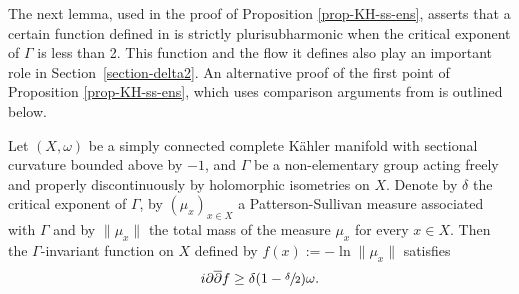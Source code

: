 The next lemma, used in the proof of Proposition \ref{prop-KH-ss-ens}, asserts that a certain function defined in \cite{connellNaturalFlowCritical2023} is strictly plurisubharmonic when the critical exponent of $\Gamma$ is less than 2. This function and the flow it defines also play an important role in Section~\ref{section-delta2}. An alternative proof of the first point of Proposition \ref{prop-KH-ss-ens}, which uses comparison arguments from \cite{greeneFunctionTheoryManifolds1979} is outlined below.

\begin{lemma}\label{lem-f-unif-spsh}
Let $(X,\omega)$ be a simply connected complete Kähler manifold with sectional curvature bounded above by $-1$, and $\Gamma$ be a non-elementary group acting freely and properly discontinuously by holomorphic isometries on $X$. Denote by $\delta$ the critical exponent of $\Gamma$, by $(\mu_x)_{x\in X}$ a Patterson-Sullivan measure associated with $\Gamma$ and by $\lVert \mu_x\rVert$ the total mass of the measure $\mu_x$ for every $x\in X$. Then the $\Gamma$\nobreakdash-invariant function on $X$ defined by $f(x):=-\ln \lVert \mu_x\rVert$ satisfies
\begin{equation*}
i\partial\overline{\partial}{f} \ge \delta(1-\sfrac{\delta}{2})\omega.
\end{equation*}
\end{lemma}

